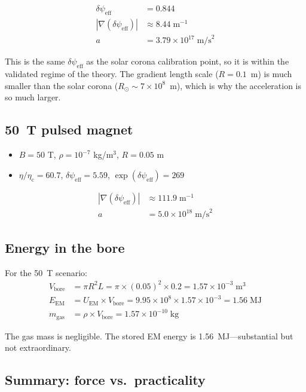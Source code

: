 \documentclass[12pt,a4paper]{article}
\newcommand{\psieff}{\psi_{\mathrm{eff}}}
\newcommand{\etac}{\eta_{\mathrm{c}}}
\begin{document}
\begin{align}
\delta\psieff &= 0.844 \\
|\nabla(\delta\psieff)| &\approx 8.44 \;\text{m}^{-1} \\
a &= 3.79 \times 10^{17} \;\text{m/s}^2
\end{align}

This is the same $\delta\psieff$ as the solar corona calibration point, so it is within the
validated regime of the theory. The gradient length scale ($R = 0.1$~m) is much smaller than
the solar corona ($R_\odot \sim 7 \times 10^8$~m), which is why the acceleration is so much larger.

\subsection{50~T pulsed magnet}

\begin{itemize}
\item $B = 50$ T, $\rho = 10^{-7}$ kg/m$^3$, $R = 0.05$ m
\item $\eta/\etac = 60.7$, $\delta\psieff = 5.59$, $\exp(\delta\psieff) = 269$
\end{itemize}

\begin{align}
|\nabla(\delta\psieff)| &\approx 111.9 \;\text{m}^{-1} \\
a &= 5.0 \times 10^{18} \;\text{m/s}^2
\end{align}

\subsection{Energy in the bore}

For the 50~T scenario:
\begin{align}
V_{\text{bore}} &= \pi R^2 L = \pi \times (0.05)^2 \times 0.2 = 1.57 \times 10^{-3} \;\text{m}^3 \\
E_{\mathrm{EM}} &= U_{\mathrm{EM}} \times V_{\text{bore}} = 9.95 \times 10^8 \times 1.57 \times 10^{-3} = 1.56 \;\text{MJ} \\
m_{\text{gas}} &= \rho \times V_{\text{bore}} = 1.57 \times 10^{-10} \;\text{kg}
\end{align}

The gas mass is negligible. The stored EM energy is 1.56~MJ---substantial but not extraordinary.

\subsection{Summary: force vs.\ practicality}
\end{document}
